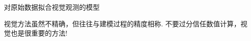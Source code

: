 \documentclass[UTF8]{ctexbeamer}
\begin{document}
\begin{frame}{对原始数据拟合视觉观测的模型}
  \begin{figure}
    \centering
    \setcounter{subfigure}{0}{}
  \end{figure}

  视觉方法虽然不精确，但往往与建模过程的精度相称. 不要过分信任数值计算，视觉也是很重要的方法!

\end{frame}
\end{document}
